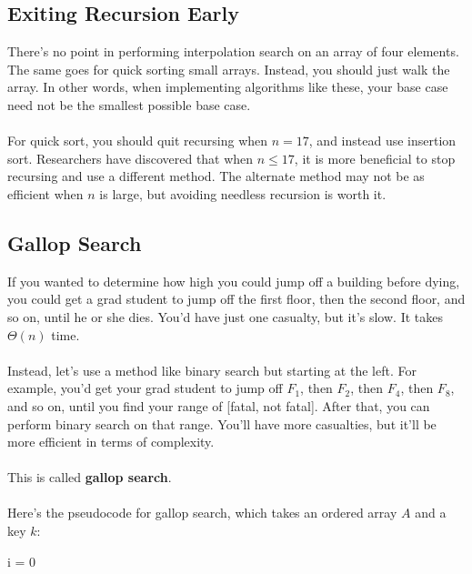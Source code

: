 \documentclass[]{article}
\theoremstyle{definition}
\begin{document}
		\subsection{Exiting Recursion Early}
			There's no point in performing interpolation search on an array of four elements. The same goes for quick sorting small arrays. Instead, you should just walk the array. In other words, when implementing algorithms like these, your base case need not be the smallest possible base case.
			\\ \\
			For quick sort, you should quit recursing when $n = 17$, and instead use insertion sort. Researchers have discovered that when $n \le 17$, it is more beneficial to stop recursing and use a different method. The alternate method may not be as efficient when $n$ is large, but avoiding needless recursion is worth it.

		\subsection{Gallop Search}
			If you wanted to determine how high you could jump off a building before dying, you could get a grad student to jump off the first floor, then the second floor, and so on, until he or she dies. You'd have just one casualty, but it's slow. It takes $\Theta(n)$ time.
			\\ \\
			Instead, let's use a method like binary search but starting at the left. For example, you'd get your grad student to jump off $F_1$, then $F_2$, then $F_4$, then $F_8$, and so on, until you find your range of [fatal, not fatal]. After that, you can perform binary search on that range. You'll have more casualties, but it'll be more efficient in terms of complexity.
			\\ \\
			This is called \textbf{gallop search}.
			\\ \\
			Here's the pseudocode for gallop search, which takes an ordered array $A$ and a key $k$: \\
			\begin{algorithm}[H]
				i = 0\;
			\end{algorithm}
\end{document}
